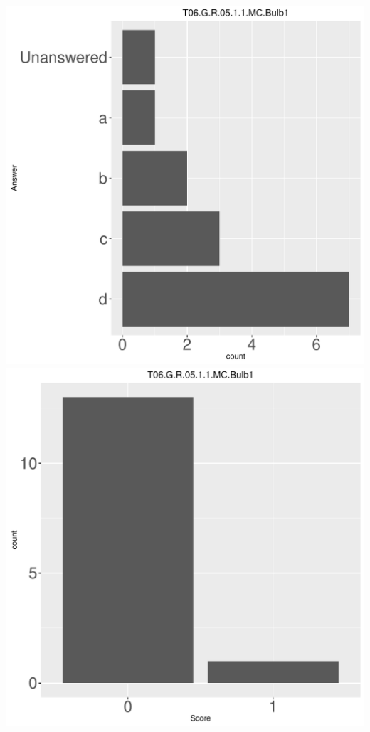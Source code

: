 \documentclass[12pt,english,nohyper]{tufte-handout}\usepackage[]{graphicx}\usepackage[]{color}
\begin{document}
\begin{center} \includegraphics[width=.45\linewidth]{Topic06_AB_71_answer} \includegraphics[width=.45\linewidth]{Topic06_AB_71_score} \end{center} 
\end{document}
